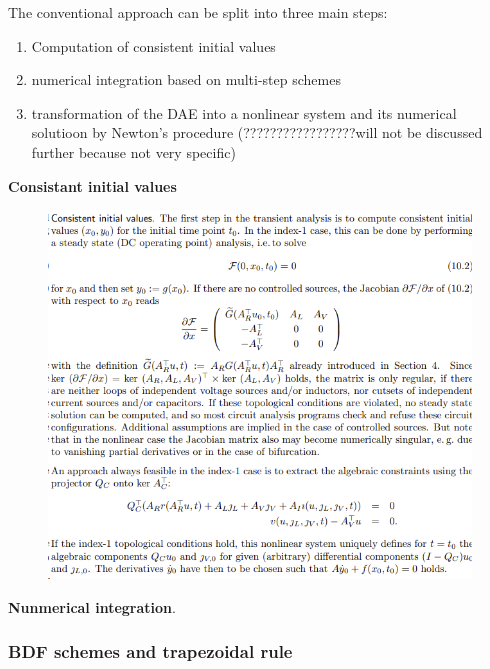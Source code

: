 The conventional approach can be split into three main steps:
\begin{enumerate}
	\item Computation of consistent initial values
	\item numerical integration based on multi-step schemes
	\item transformation of the DAE into a nonlinear system and its numerical solutioon by Newton's procedure (?????????????????will not be discussed further because not very specific)
\end{enumerate}

\textbf{Consistant initial values} 
\begin{figure}[H]
	\centering
	\includegraphics[width=0.7\linewidth]{screenshot009}
	\caption{}
	\label{fig:screenshot009}
\end{figure}

\textbf{Nunmerical integration}.


\subsubsection{BDF schemes and trapezoidal rule}